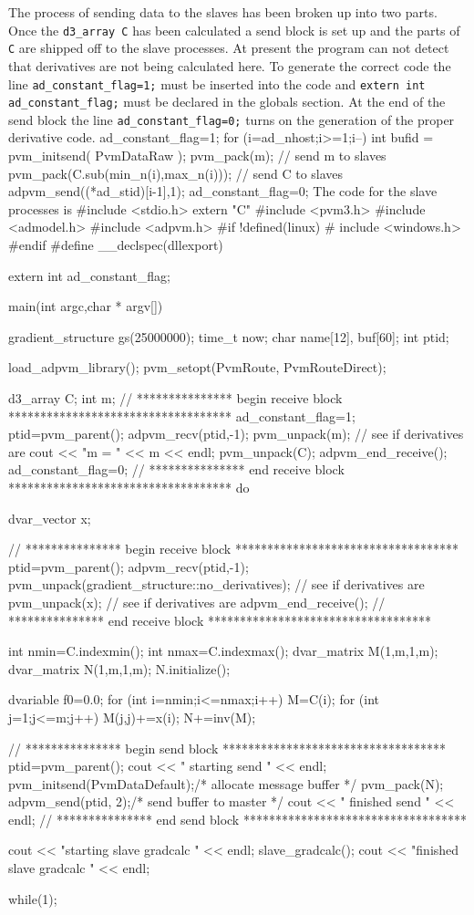 \endexample
The process of sending data to the slaves has been broken up into two parts. Once the
{\tt d3\_array C} has been calculated a send block is set up and the parts of
{\tt C} are shipped off to the slave processes. At present the program can not
detect that derivatives are not being calculated here.  To generate the
correct code the line {\tt ad\_constant\_flag=1;} must be inserted into the code and
{\tt extern int ad\_constant\_flag;} must be declared in the globals section.
At the end of the send block the line {\tt ad\_constant\_flag=0;}  turns on the
generation of the proper derivative code.
\beginexample
  ad_constant_flag=1;
  for (i=ad_nhost;i>=1;i--) 
  {
    int bufid = pvm_initsend( PvmDataRaw );
    pvm_pack(m); // send m to slaves
    pvm_pack(C.sub(min_n(i),max_n(i))); // send C to slaves
    adpvm_send((*ad_stid)[i-1],1);
  }
  ad_constant_flag=0;
\endexample
The code for the slave processes is
\beginexample
#include <stdio.h>
extern "C" {
#include <pvm3.h>
}
#include <admodel.h>
#include <adpvm.h>
#if !defined(linux)
#  include <windows.h>
#endif
#define  __declspec(dllexport) 

extern int ad_constant_flag;

main(int argc,char * argv[])
{
  gradient_structure gs(25000000);
  time_t now;
  char name[12], buf[60];
  int ptid;

  load_adpvm_library();
  pvm_setopt(PvmRoute, PvmRouteDirect);
  
  d3_array C;
  int m;
  // ***************  begin receive block ***********************************
   ad_constant_flag=1;
   ptid=pvm_parent();
   adpvm_recv(ptid,-1);
   pvm_unpack(m);  // see if derivatives are
   cout << "m = " << m << endl;
   pvm_unpack(C); 
     adpvm_end_receive();
   ad_constant_flag=0;
  // ***************  end receive block ***********************************
  do
  {
    dvar_vector x;

    // ***************  begin receive block ***********************************
   ptid=pvm_parent();
     adpvm_recv(ptid,-1);
     pvm_unpack(gradient_structure::no_derivatives);  // see if derivatives are
     pvm_unpack(x);  // see if derivatives are
     adpvm_end_receive();
    // ***************  end receive block ***********************************
  
     int nmin=C.indexmin();
     int nmax=C.indexmax();
     dvar_matrix M(1,m,1,m);
     dvar_matrix N(1,m,1,m);
     N.initialize();

     dvariable f0=0.0;
     for (int i=nmin;i<=nmax;i++)
     {
       M=C(i);
       for (int j=1;j<=m;j++)
       {
         M(j,j)+=x(i);
       }
       N+=inv(M);
     }
  
    // ***************  begin send block ***********************************
   ptid=pvm_parent();
    cout << " starting send " << endl;
    pvm_initsend(PvmDataDefault);/* allocate message buffer */	
    pvm_pack(N);
    adpvm_send(ptid, 2);/* send buffer to master */
    cout << " finished send " << endl;
    // ***************  end send block ***********************************

    cout << "starting slave gradcalc " << endl;
    slave_gradcalc();
    cout << "finished slave gradcalc " << endl;
  }
  while(1);
}

